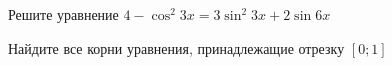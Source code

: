 \begin{ex}
	\begin{condition}
		\begin{enumcols}[label=\asbuk*)]
			\item Решите уравнение \( 4-\cos^2 3x = 3\sin^2 3x + 2\sin 6x \)
			\item Найдите все корни уравнения, принадлежащие отрезку \( \left[0;1\right] \)
		\end{enumcols}
	\end{condition}
\end{ex}